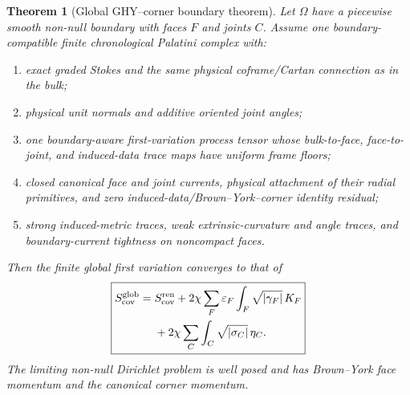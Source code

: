 \documentclass[11pt]{article}
\newtheorem{theorem}{Theorem}[section]
\theoremstyle{definition}
\theoremstyle{remark}
\begin{document}
\begin{theorem}[Global GHY--corner boundary theorem]
\label{thm:master-global-boundary-v036}
Let \(\Omega\) have a piecewise smooth non-null boundary with faces \(F\) and
joints \(C\).  Assume one boundary-compatible finite chronological Palatini
complex with:
\begin{enumerate}[label=\textup{(B\arabic*)},leftmargin=3em]
\item exact graded Stokes and the same physical coframe/Cartan connection as in
      the bulk;
\item physical unit normals and additive oriented joint angles;
\item one boundary-aware first-variation process tensor whose bulk-to-face,
      face-to-joint, and induced-data trace maps have uniform frame floors;
\item closed canonical face and joint currents, physical attachment of their
      radial primitives, and zero induced-data/Brown--York--corner identity
      residual;
\item strong induced-metric traces, weak extrinsic-curvature and angle traces,
      and boundary-current tightness on noncompact faces.
\end{enumerate}
Then the finite global first variation converges to that of
\[
 \boxed{
 \begin{aligned}
 S_{\rm cov}^{\rm glob}={}&S_{\rm cov}^{\rm ren}
 +2\chi\sum_F\varepsilon_F\int_F\sqrt{|\gamma_F|}\,K_F\\
 &+2\chi\sum_C\int_C\sqrt{|\sigma_C|}\,\eta_C.
 \end{aligned}}
\]
The limiting non-null Dirichlet problem is well posed and has Brown--York face
momentum and the canonical corner momentum.
\end{theorem}
\end{document}
